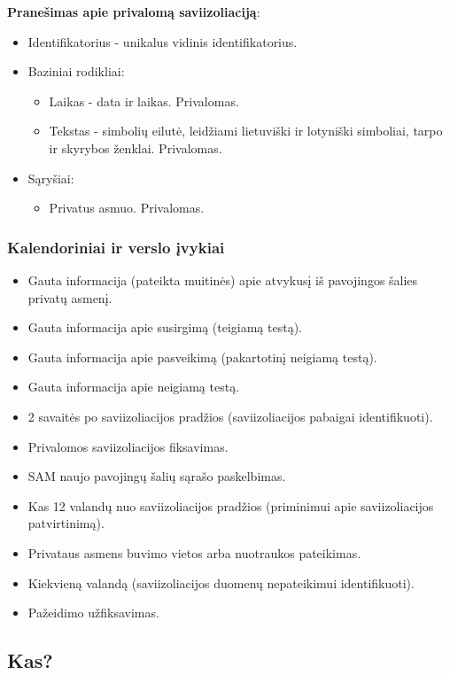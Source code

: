 \documentclass{VUMIFPSkursinis}
\begin{document}
\noindent\textbf{Pranešimas apie privalomą saviizoliaciją}:
\begin{itemize}
	\item Identifikatorius - unikalus vidinis identifikatorius.
	\item Baziniai rodikliai:
	\begin{itemize}
		\item Laikas - data ir laikas. Privalomas.
		\item Tekstas - simbolių eilutė, leidžiami lietuviški ir lotyniški simboliai, tarpo ir skyrybos ženklai. Privalomas.
	\end{itemize}
	\item Sąryšiai:
	\begin{itemize}
		\item Privatus asmuo. Privalomas.
	\end{itemize}	
\end{itemize}

\subsubsection{Kalendoriniai ir verslo įvykiai}

\begin{itemize}
	\item Gauta informacija (pateikta muitinės) apie atvykusį iš pavojingos šalies privatų asmenį.
	\item Gauta informacija apie susirgimą (teigiamą testą).
	\item Gauta informacija apie pasveikimą (pakartotinį neigiamą testą).
	\item Gauta informacija apie neigiamą testą.
	\item 2 savaitės po saviizoliacijos pradžios (saviizoliacijos pabaigai identifikuoti).
	\item Privalomos saviizoliacijos fiksavimas.
	\item SAM naujo pavojingų šalių sąrašo paskelbimas.
	\item Kas 12 valandų nuo saviizoliacijos pradžios (priminimui apie saviizoliacijos patvirtinimą).
	\item Privataus asmens buvimo vietos arba nuotraukos pateikimas.
	\item Kiekvieną valandą (saviizoliacijos duomenų nepateikimui identifikuoti).
	\item Pažeidimo užfiksavimas.
\end{itemize}

\subsection{Kas?}
\end{document}
